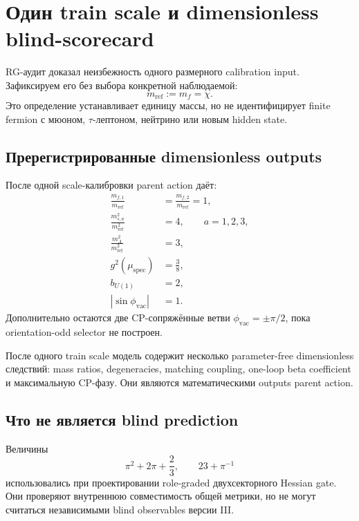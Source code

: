\chapter{Один train scale и dimensionless blind-scorecard}

RG-аудит доказал неизбежность одного размерного calibration input.
Зафиксируем его без выбора конкретной наблюдаемой:
\begin{equation}
 m_{\mathrm{ref}}
 :=m_f=\chi.
\end{equation}
Это определение устанавливает единицу массы, но не идентифицирует finite
fermion с мюоном, \(\tau\)-лептоном, нейтрино или новым hidden state.

\section{Пререгистрированные dimensionless outputs}

После одной scale-калибровки parent action даёт:
\begin{align}
 \frac{m_{f,1}}{m_{\mathrm{ref}}}
 &=
 \frac{m_{f,2}}{m_{\mathrm{ref}}}=1,
 \\
 \frac{m_{s,a}^2}{m_{\mathrm{ref}}^2}
 &=4,
 \qquad a=1,2,3,
 \\
 \frac{m_A^2}{m_{\mathrm{ref}}^2}
 &=3,
 \\
 g^2(\mu_{\mathrm{spec}})
 &=\frac38,
 \\
 b_{U(1)}
 &=2,
 \\
 |\sin\phi_{\mathrm{vac}}|
 &=1.
\end{align}
Дополнительно остаются две CP-сопряжённые ветви
\(\phi_{\mathrm{vac}}=\pm\pi/2\), пока orientation-odd selector не
построен.

\begin{proposition}
После одного train scale модель содержит несколько parameter-free
dimensionless следствий: mass ratios, degeneracies, matching coupling,
one-loop beta coefficient и максимальную CP-фазу. Они являются
математическими outputs parent action.
\end{proposition}

\section{Что не является blind prediction}

Величины
\begin{equation}
 \pi^2+2\pi+\frac23,
 \qquad
 23+\pi^{-1}
\end{equation}
использовались при проектировании role-graded двухсекторного Hessian gate.
Они проверяют внутреннюю совместимость общей метрики, но не могут
считаться независимыми blind observables версии III.

